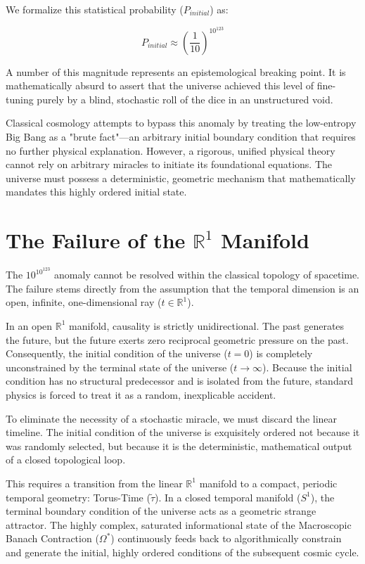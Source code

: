 \documentclass[12pt,openany]{book}
\theoremstyle{plain}
\theoremstyle{definition}
\theoremstyle{remark}
\begin{document}
We formalize this statistical probability ($P_{initial}$) as:

\begin{equation}
P_{initial} \approx \left(\frac{1}{10}\right)^{10^{123}}
\end{equation}

A number of this magnitude represents an epistemological breaking point. It is mathematically absurd to assert that the universe achieved this level of fine-tuning purely by a blind, stochastic roll of the dice in an unstructured void. 

Classical cosmology attempts to bypass this anomaly by treating the low-entropy Big Bang as a "brute fact"—an arbitrary initial boundary condition that requires no further physical explanation. However, a rigorous, unified physical theory cannot rely on arbitrary miracles to initiate its foundational equations. The universe must possess a deterministic, geometric mechanism that mathematically mandates this highly ordered initial state.

\section{The Failure of the $\mathbb{R}^1$ Manifold}

The $10^{10^{123}}$ anomaly cannot be resolved within the classical topology of spacetime. The failure stems directly from the assumption that the temporal dimension is an open, infinite, one-dimensional ray ($t \in \mathbb{R}^1$).

In an open $\mathbb{R}^1$ manifold, causality is strictly unidirectional. The past generates the future, but the future exerts zero reciprocal geometric pressure on the past. Consequently, the initial condition of the universe ($t=0$) is completely unconstrained by the terminal state of the universe ($t \to \infty$). Because the initial condition has no structural predecessor and is isolated from the future, standard physics is forced to treat it as a random, inexplicable accident.

To eliminate the necessity of a stochastic miracle, we must discard the linear timeline. The initial condition of the universe is exquisitely ordered not because it was randomly selected, but because it is the deterministic, mathematical output of a closed topological loop. 

This requires a transition from the linear $\mathbb{R}^1$ manifold to a compact, periodic temporal geometry: Torus-Time ($\tilde{\tau}$). In a closed temporal manifold ($S^1$), the terminal boundary condition of the universe acts as a geometric strange attractor. The highly complex, saturated informational state of the Macroscopic Banach Contraction ($\Omega^*$) continuously feeds back to algorithmically constrain and generate the initial, highly ordered conditions of the subsequent cosmic cycle.
\end{document}
